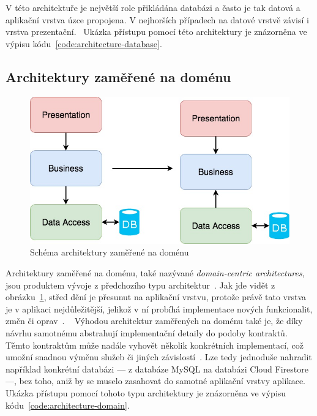 V této architektuře je největší role přikládána databázi
a často je tak datová a aplikační vrstva úzce propojena.
V nejhorších případech na datové vrstvě závisí i
vrstva prezentační.~\cite{architecture}
Ukázka přístupu pomocí této architektury je znázorněna ve výpisu
kódu~\ref{code:architecture-database}.

\subsection{Architektury zaměřené na doménu}

\begin{figure}
    \centering
    \includegraphics[width=0.5\linewidth]{assets/technology-research/architecture/domain-centric.jpeg}
    \caption{Schéma architektury zaměřené na doménu ~\cite{architecture}}
    \label{fig:architecture_domain}
\end{figure}

Architektury zaměřené na doménu,
také nazývané \emph{domain-centric architectures},
jsou produktem vývoje z předchozího typu architektur~\cite{architecture}.
Jak jde vidět z obrázku~\ref{fig:architecture_domain},
střed dění je přesunut na aplikační vrstvu,
protože právě tato vrstva je v aplikaci nejdůležitější,
jelikož v ní probíhá implementace nových funkcionalit,
změn či oprav~\cite{architecture}.
\emph{}~\cite[kapitola~15]{martin_clean_architecture}
Výhodou architektur zaměřených na doménu také je,
že díky návrhu samotnému abstrahují implementační detaily do podoby kontraktů.
Těmto kontraktům může nadále vyhovět několik konkrétních implementací,
což umožní snadnou výměnu služeb
či jiných závislostí~\cite[kapitola~15]{martin_clean_architecture}.
Lze tedy jednoduše nahradit například konkrétní databázi
--- z databáze MySQL na databázi Cloud Firestore ---,
bez toho,
aniž by se muselo zasahovat do samotné aplikační vrstvy aplikace.
Ukázka přístupu pomocí tohoto typu architektury je znázorněna
ve výpisu kódu~\ref{code:architecture-domain}.

